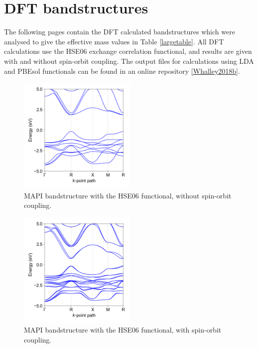 \chapter{\label{app:2-bandstructures}DFT bandstructures}

The following pages contain the DFT calculated bandstructures which were analysed to give the effective mass values in Table \ref{largetable}. All DFT calculations use the HSE06 exchange correlation functional, and results  are given with and without spin-orbit coupling. The output files for calculations using LDA and PBEsol functionals can be found in an online repository \ref{Whalley2018b}.

\clearpage

\begin{figure}[htb] \centering
\includegraphics[width=0.5\textwidth]{./figures/ap2/MAPI_hybrid.png}
\caption[MAPI bandstructure, HSE06, no-SoC]{MAPI bandstructure with the HSE06 functional, without spin-orbit coupling. }
\end{figure}

\begin{figure}[htb] \centering
\includegraphics[width=0.5\textwidth]{./figures/ap2/MAPI_hybrid_SoC.png}
\caption[MAPI bandstructure, HSE06, SoC]{MAPI bandstructure with the HSE06 functional, with spin-orbit coupling. }
\end{figure}

